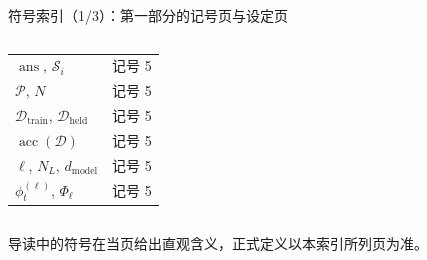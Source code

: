 \documentclass[aspectratio=169,11pt]{beamer}
\newcommand{\acc}{\operatorname{acc}}
\newcommand{\ans}{\operatorname{ans}}
\newcommand{\dm}{d_{\mathrm{model}}}
\newcommand{\gnote}[1]{{\scriptsize\color{cGray}#1}}
\begin{document}
\begin{frame}{符号索引（1/3）：第一部分的记号页与设定页}
\begin{columns}[T]
\begin{tabular}{@{}ll@{}}
$\ans$, $\mathcal S_i$ & 记号 5\\
$\mathcal P$, $N$ & 记号 5\\
$\mathcal D_{\mathrm{train}}$, $\mathcal D_{\mathrm{held}}$ & 记号 5\\
$\acc(\mathcal D)$ & 记号 5\\
$\ell$, $N_L$, $\dm$ & 记号 5\\
$\phi^{(\ell)}_t$, $\Phi_\ell$ & 记号 5\\
\bottomrule
\end{tabular}
\end{columns}
\vspace{4pt}
\gnote{导读中的符号在当页给出直观含义，正式定义以本索引所列页为准。}
\end{frame}

\end{document}
